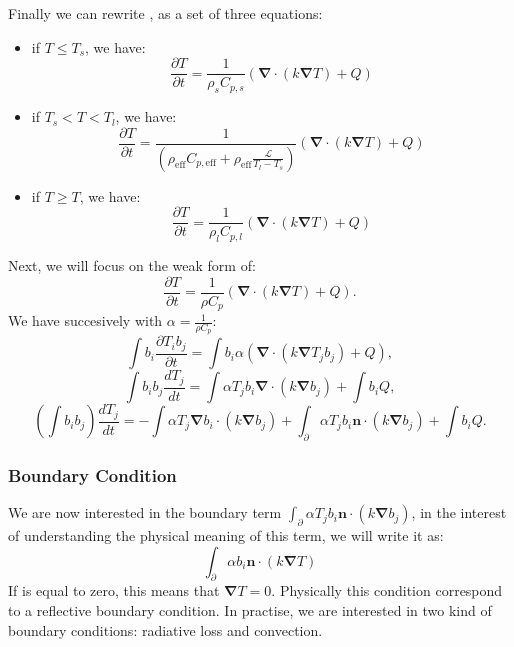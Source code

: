 \documentclass[letterpaper]{article}
\newcommand\bn{\boldsymbol{\nabla}}
\renewcommand{\(}{\left(}
\renewcommand{\)}{\right)}
\renewcommand{\[}{\left[}
\renewcommand{\]}{\right]}
\begin{document}
Finally we can rewrite , as a set of three equations:
\begin{itemize}
  \item if $T \leq T_s$, we have:
    \begin{equation}
      \frac{\partial T}{\partial t} = \frac{1}{\rho_s C_{p,s}} \(\bn \cdot \(k
      \bn T\) + Q\)
    \end{equation}
  \item if $T_s < T < T_l$, we have:
    \begin{equation}
      \frac{\partial T}{\partial t} = \frac{1}{\(\rho_{\text{eff}}
      C_{p,\text{eff}} + \rho_{\text{eff}} \frac{\mathcal{L}}{T_l-T_s}\)} \(
      \bn \cdot \(k \bn T\) + Q \)
    \end{equation}
  \item if $T \geq T$, we have:
    \begin{equation}
      \frac{\partial T}{\partial t} = \frac{1}{\rho_l C_{p,l}} \(\bn \cdot \(k
      \bn T\) + Q\)
    \end{equation}
\end{itemize}

Next, we will focus on the weak form of:
\begin{equation}
  \frac{\partial T}{\partial t} = \frac{1}{\rho C_{p}} \(\bn \cdot \(k
  \bn T\) + Q\).
\end{equation}
We have succesively with $\alpha = \frac{1}{\rho C_{p}}$:
\begin{equation}
 \int b_i \frac{\partial T_i b_j}{\partial t} = \int b_i \alpha \(\bn \cdot \(k
  \bn T_j b_j\) + Q\),
\end{equation}
\begin{equation}
  \int b_i b_j \frac{d T_j}{dt} = \int \alpha T_j b_i \bn \cdot \(k \bn b_j\) +
  \int b_i Q,
\end{equation}
\begin{equation}
  \(\int b_i b_j\) \frac{d T_j}{dt} = - \int \alpha T_j \bn b_i \cdot \(k \bn b_j\) +
  \int_{\partial} \alpha T_j b_i \boldsymbol{n}\cdot \(k \bn b_j\) + \int b_i Q.
\end{equation}

\subsubsection{Boundary Condition}
We are now interested in the boundary term  $\int_{\partial} \alpha T_j b_i
\boldsymbol{n}\cdot \(k \bn b_j\)$, in the interest of understanding the
physical meaning of this term, we will write it as:
\begin{equation}
 \int_{\partial} \alpha b_i \boldsymbol{n}\cdot \(k \bn T\)
  \label{boundary}
\end{equation}
If  is equal to zero, this means that $\bn T=0$. Physically this
condition correspond to a reflective boundary condition. In practise, we are
interested in two kind of boundary conditions: radiative loss and convection.
\end{document}
